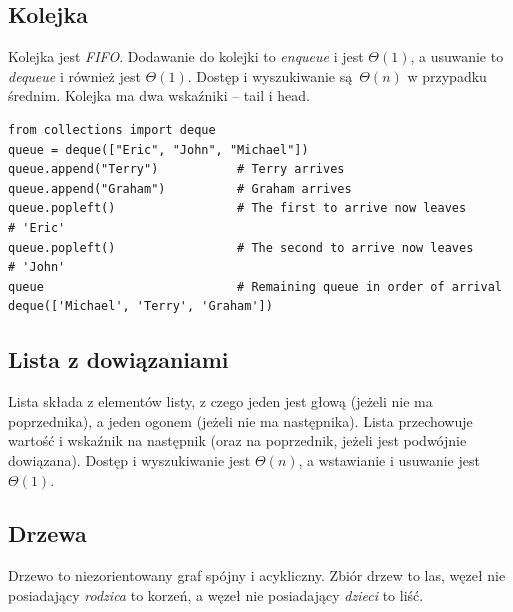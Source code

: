\documentclass[10pt, oneside]{article}
\theoremstyle{remark}
\begin{document}
\subsection{Kolejka}
Kolejka jest \emph{FIFO}.
Dodawanie do kolejki to \emph{enqueue} i jest $\Theta(1)$, a usuwanie to \emph{dequeue} i również jest $\Theta(1)$.
Dostęp i wyszukiwanie są $\Theta(n)$ w przypadku średnim.
Kolejka ma dwa wskaźniki -- tail i head.
\begin{verbatim}
from collections import deque
queue = deque(["Eric", "John", "Michael"])
queue.append("Terry")           # Terry arrives
queue.append("Graham")          # Graham arrives
queue.popleft()                 # The first to arrive now leaves
# 'Eric'
queue.popleft()                 # The second to arrive now leaves
# 'John'
queue                           # Remaining queue in order of arrival
deque(['Michael', 'Terry', 'Graham'])
\end{verbatim}

\subsection{Lista z dowiązaniami}
Lista składa z elementów listy, z czego jeden jest głową (jeżeli nie ma poprzednika), a jeden ogonem (jeżeli nie ma następnika).
Lista przechowuje wartość i wskaźnik na następnik (oraz na poprzednik, jeżeli jest podwójnie dowiązana).
Dostęp i wyszukiwanie jest $\Theta(n)$, a wstawianie i usuwanie jest $\Theta(1)$.

\subsection{Drzewa}
Drzewo to niezorientowany graf spójny i acykliczny.
Zbiór drzew to las, węzeł nie posiadający \emph{rodzica} to korzeń, a węzeł nie posiadający \emph{dzieci} to liść.
\end{document}
